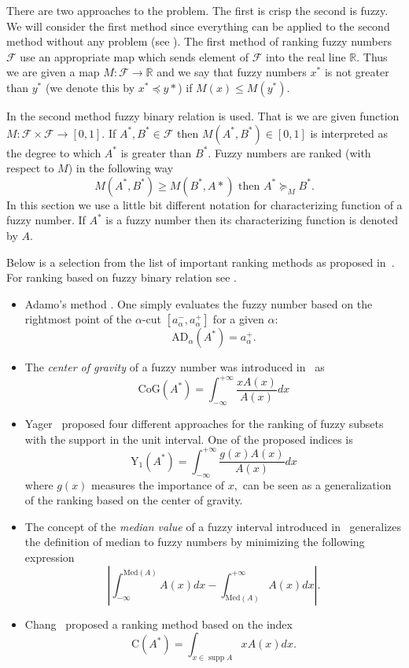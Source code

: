 \documentclass[leqno,12pt]{amsart}
\newcommand{\R}{\mathbb{R}}
\theoremstyle{remark}
\theoremstyle{remark}
\theoremstyle{remark}
\theoremstyle{definition}
\numberwithin{equation}{section}
\DeclareMathOperator{\supp}{supp}
\begin{document}
There are two approaches to the problem. The first is crisp the second is fuzzy. We will consider the first method since everything can be applied to the second method without any problem (see \cite[p.629]{Brunelli}).
The first method of ranking fuzzy numbers $\mathcal F$ use an appropriate map which sends element of $\mathcal F$ into the real line $\R.$ Thus we are given a map $M:\mathcal F\to\R$
and we say that fuzzy numbers $x^*$ is not greater than $y^*$ (we denote this by $x^*\preccurlyeq y*$) if $M(x)\leq M(y^*).$
\par
In the second method fuzzy binary relation is used. That is we are given function $M:\mathcal F\times\mathcal F\to[0,1].$ If $A^*,B^*\in\mathcal F$ then $M(A^*,B^*)\in[0,1]$ is interpreted as the degree to which $A^*$ is greater than $B^*.$ Fuzzy numbers are ranked (with respect to $M$) in the following way
$$M(A^*,B^*)\geq M(B^*,A*)\text{ then }A^*\succcurlyeq_M B^*.$$ In this section we use a little bit different notation for characterizing function of a fuzzy number. If $A^*$ is a fuzzy number then its characterizing function is denoted by $A.$
\par
Below is a selection from the list of important ranking methods as proposed in~\cite{Brunelli}. For ranking based on fuzzy binary relation see \cite{Brunelli}.
\begin{itemize}
\item Adamo's method \cite{Adamo}.
One simply evaluates the fuzzy number based on the rightmost
point of the $\alpha$-cut $[a^-_\alpha,a^+_\alpha]$ for a given $\alpha$:
\begin{equation*}
\mathrm{AD}_{\alpha}(A^*) = a^+_\alpha.
\end{equation*}
\item
The {\em center of gravity} of a fuzzy number was introduced in~\cite{Ost} as
\begin{equation*}
\mathrm{CoG}(A^*) = \int_{-\infty}^{+\infty} \frac{xA(x)}{A(x)}dx
\end{equation*}
\item Yager~\cite{Yag} proposed four different approaches for the ranking of fuzzy subsets with the support in the unit interval. One of the proposed indices is
\begin{equation*}
\mathrm{Y}_1(A^*) = \int_{-\infty}^{+\infty} \frac{g(x) A(x)}{A(x)}dx
\end{equation*}
where $g(x)$ measures the importance of $x,$ can be seen as a generalization of the ranking based on the center of gravity.
\item
The concept of the {\em median value} of a fuzzy interval introduced in~\cite{medianpaper}  generalizes the definition
of median to fuzzy numbers by minimizing the following expression
\begin{equation*}
|\int_{-\infty}^{\mathrm{Med}(A)}A(x)dx- \int_{\mathrm{Med}(A)}^{+\infty}A(x)dx|.
\end{equation*}
\item
Chang~\cite{Chang} proposed a ranking method based on the index
\begin{equation*}
\mathrm{C}(A^*) = \int_{x\in\supp A} xA(x)dx.
\end{equation*}
\end{itemize}
\end{document}
